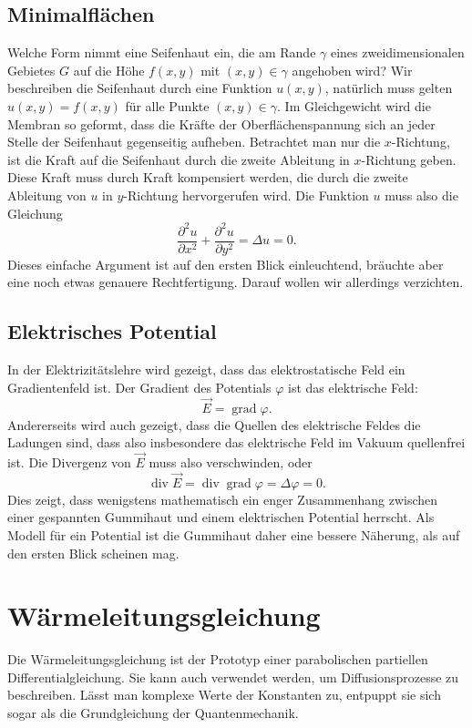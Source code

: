 \subsection{Minimalflächen\label{beispiele:minimalflaechen}}
Welche Form nimmt eine Seifenhaut ein, die am Rande $\gamma$ eines
zweidimensionalen Gebietes $G$ auf die Höhe $f(x,y)$ mit $(x,y)\in \gamma$
angehoben wird? Wir beschreiben die Seifenhaut durch eine Funktion
$ u (x,y)$, natürlich muss gelten $ u (x,y)=f(x,y)$ für alle
Punkte $(x,y)\in\gamma$.
Im Gleichgewicht wird die Membran so geformt, dass die Kräfte
der Oberflächenspannung sich an jeder Stelle der Seifenhaut gegenseitig
aufheben. Betrachtet man nur die $x$-Richtung, ist die Kraft auf die
Seifenhaut durch die zweite Ableitung in $x$-Richtung geben.
Diese Kraft muss durch Kraft kompensiert werden, die durch die
zweite Ableitung von $ u $ in $y$-Richtung hervorgerufen wird.
Die Funktion $ u $ muss also die Gleichung
\[
\frac{\partial^2 u }{\partial x^2}+\frac{\partial^2 u }{\partial y^2}
=\Delta u =0.
\]
Dieses einfache Argument ist auf den ersten Blick einleuchtend, bräuchte
aber eine noch etwas genauere Rechtfertigung. Darauf wollen wir allerdings
verzichten.

\subsection{Elektrisches Potential\label{beispiele:elektrischespotential}}
In der Elektrizitätslehre wird gezeigt, dass das elektrostatische Feld 
ein Gradientenfeld ist. Der Gradient des Potentials $\varphi$  ist das
elektrische Feld:
\[
\vec E=\operatorname{grad}\varphi.
\]
Andererseits wird auch gezeigt, dass die Quellen des elektrische Feldes die
Ladungen sind, dass also insbesondere das elektrische Feld im Vakuum quellenfrei ist.
Die Divergenz von $\vec E$ muss also verschwinden, oder
\[
\operatorname{div}\vec E=\operatorname{div}\operatorname{grad}\varphi
=\Delta \varphi=0.
\]
Dies zeigt, dass wenigstens mathematisch ein enger Zusammenhang zwischen
einer gespannten Gummihaut und einem elektrischen Potential herrscht.
Als Modell für ein Potential ist die Gummihaut daher eine bessere
Näherung, als auf den ersten Blick scheinen mag.

\section{Wärmeleitungsgleichung\label{beispiele:waermeleitung}}
Die Wärmeleitungsgleichung ist der Prototyp einer parabolischen partiellen
Differentialgleichung. Sie kann auch verwendet werden, um Diffusionsprozesse
zu beschreiben. Lässt man komplexe Werte der Konstanten zu, entpuppt
sie sich sogar als die Grundgleichung der Quantenmechanik.

